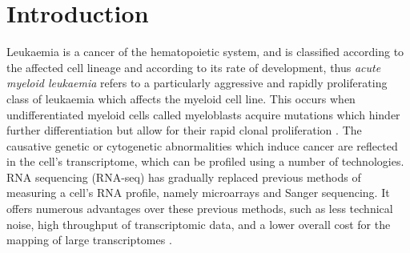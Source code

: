 \chapter{Introduction}
\label{intro}
Leukaemia is a cancer of the hematopoietic system, and is classified according to the affected cell lineage and according to its rate of development, thus \textit{acute myeloid leukaemia} refers to a particularly aggressive and rapidly proliferating class of leukaemia which affects the myeloid cell line. This occurs when undifferentiated myeloid cells called myeloblasts acquire mutations which hinder further differentiation but allow for their rapid clonal proliferation \citep{Khwaja2016}. The causative genetic or cytogenetic abnormalities which induce cancer are reflected in the cell's transcriptome, which can be profiled using a number of technologies. RNA sequencing (RNA-seq) has gradually replaced previous methods of measuring a cell's RNA profile, namely microarrays and Sanger sequencing. It offers numerous advantages over these previous methods, such as less technical noise, high throughput of transcriptomic data, and a lower overall cost for the mapping of large transcriptomes \citep{zhao2014comparison}. 

